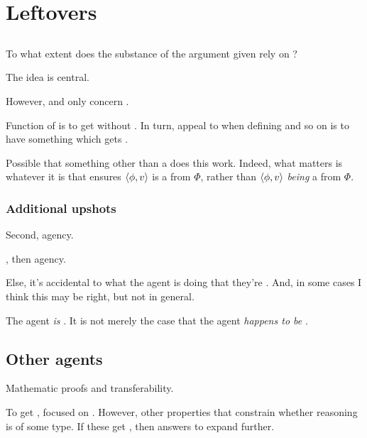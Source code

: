 
\chapter{Leftovers}
\label{cha:leftovers}


\section{}
\label{sec:fc3}


\begin{note}
  To what extent does the substance of the argument given rely on ?

  The idea is central.

  However, \qWhy{} and \qWhyV{} only concern .

  Function of  is to get \ros{} without \wit{}.
  In turn, appeal to  when defining  and so on is to have something which gets \ros{}.

  Possible that something other than a \fc{} does this work.
  Indeed, what matters is whatever it is that ensures \(\langle \phi, v \rangle\) is a \fc{} from \(\Phi\), rather than \(\langle \phi, v \rangle\) \emph{being} a \fc{} from \(\Phi\).
\end{note}



\subsection{Additional upshots}


\begin{note}
  Second, agency.

  \tCV{}, then agency.

  Else, it's accidental to what the agent is doing that they're \tCV{}.
  And, in some cases I think this may be right, but not in general.

  The agent \emph{is} \tCV{}.
  It is not merely the case that the agent \emph{happens to be} \tCV{}.
\end{note}




\section{Other agents}
\label{sec:other-agents}


\begin{note}
  Mathematic proofs and transferability.

  To get , focused on \tC{}.
  However, other properties that constrain whether reasoning is of some type.
  If these get \ros{}, then answers to \qWhy{} expand further.
\end{note}

